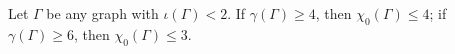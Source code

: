Let $\Gamma$ be any graph with $\iota(\Gamma) < 2$. If $\gamma(\Gamma) \geq 4$, then $\chi_0(\Gamma) \leq 4$; if $\gamma(\Gamma) \geq 6$, then $\chi_0(\Gamma) \leq 3$.
